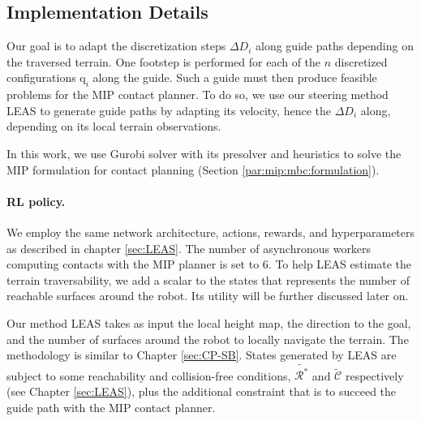 

\subsection{Implementation Details}
\label{subsub:mip:implementation_details}
Our goal is to adapt the discretization steps $\Delta D_i$ along guide paths depending on the traversed terrain.
One footstep is performed for each of the $n$ discretized configurations $\mbox{q}_i$ along the guide.
Such a guide must then produce feasible problems for the MIP contact planner.
To do so, we use our steering method LEAS to generate guide paths by adapting its velocity, hence the $\Delta D_i$ along, depending on its local terrain observations.

In this work, we use Gurobi solver \cite{gurobi} with its presolver and heuristics to solve the MIP formulation for contact planning (Section \ref{par:mip:mbc:formulation}).

\paragraph{RL policy.}
We employ the same network architecture, actions, rewards, and hyperparameters as described in chapter \ref{sec:LEAS}. The number of asynchronous workers computing contacts with the MIP planner is set to 6.
To help LEAS estimate the terrain traversability, we add a scalar to the states that represents the number of reachable surfaces around the robot. Its utility will be further discussed later on.

Our method LEAS takes as input the local height map, the direction to the goal, and the number of surfaces around the robot to locally navigate the terrain.
The methodology is similar to Chapter \ref{sec:CP-SB}.
States generated by LEAS are subject to some reachability and collision-free conditions, $\tilde{\mathcal{R}^*}$ and $\tilde{\mathcal{C}}$ respectively (see Chapter \ref{sec:LEAS}), plus the additional constraint that is to succeed the guide path with the MIP contact planner.

